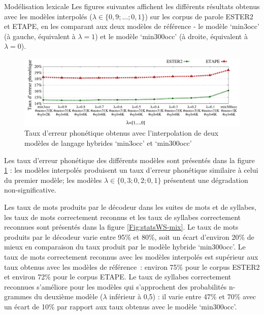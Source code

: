 \documentclass{style/these}
\begin{document}
\begin{part}{Modélisation lexicale}
Les figures suivantes affichent les différents résultats obtenus avec les modèles interpolés ($\lambda \in \{0,9; ...; 0,1\}$) sur les corpus de parole ESTER2 et ETAPE, en les comparant aux deux modèles de référence - le modèle `min3occ' (à gauche, équivalent à $\lambda=1$) et le modèle `min300occ' (à droite, équivalent à $\lambda=0$).

\begin{figure}[h!]
\centering
\includegraphics[scale=0.6]{images/results/results_PER_mixedLMs-3-300.pdf}
\caption{Taux d'erreur phonétique obtenus avec l'interpolation de deux modèles de langage hybrides `min3occ' et `min300occ'}
\label{Fig:PER-iLM}
\end{figure}

Les taux d'erreur phonétique des différents modèles sont présentés dans la figure \ref{Fig:PER-iLM} : les modèles interpolés produisent un taux d'erreur phonétique similaire à celui du premier modèle; les modèles $\lambda \in \{0,3; 0,2; 0,1\}$ présentent une dégradation non-significative. 

Les taux de mots produits par le décodeur dans les suites de mots et de syllabes,  les taux de mots correctement reconnus et les taux de syllabes correctement reconnues sont présentés dans la figure \ref{Fig:statsWS-mix}. 
Le taux de mots produits par le décodeur varie entre 95\% et 80\%, soit un écart d'environ 20\% de mieux en comparaison du taux produit par le modèle hybride `min300occ'.
Le taux de mots correctement reconnus avec les modèles interpolés est supérieur aux taux obtenus avec les modèles de référence~: environ 75\% pour le corpus ESTER2 et environ 72\% pour le corpus ETAPE. 
Le taux de syllabes correctement reconnues s'améliore pour les modèles qui s'approchent des probabilités n-grammes du deuxième modèle ($\lambda$ inférieur à 0,5) : il varie entre 47\% et 70\% avec un écart de 10\% par rapport aux taux obtenus avec le modèle `min300occ'.  



\end{part}
\end{document}
